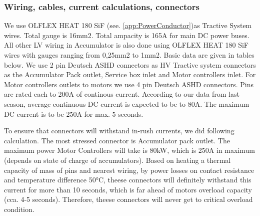 \subsubsection{Wiring, cables, current calculations, connectors}

We use OLFLEX HEAT 180 SiF (see. \ref{app:PowerConductor})as Tractive System wires. Total gauge is 16mm2. Total ampacity is 165A for main DC power buses. All other LV wiring in Accumulator is also done using OLFLEX HEAT 180 SiF wires with gauges ranging from 0,25mm2 to 1mm2. Basic data are given in tables below. We use 2 pin Deutsch ASHD connectors as HV Tractive system connectors as the Accumulator Pack outlet, Service box inlet and Motor controllers inlet. For Motor controllers outlets to motors we use 4 pin Deutsch ASHD connectors. Pins are rated each to 200A of continous current. According to our data from last season, average continuous DC current is expected to be to 80A. The maximum DC current is to be 250A for max. 5 seconds.

To ensure that connectors will withstand in-rush currents, we did following calculation. The most stressed connector is Accumulator pack outlet. The maximum power Motor Controllers will take is 80kW, which is 250A in maximum (depends on state of charge of accumulators). Based on heating a thermal capacity of mass of pins and nearest wiring, by power losses on contact resistance and temperature difference 50°C, theese connectors will definitely withstand this current for more than 10 seconds, which is far ahead of motors overload capacity (cca. 4-5 seconds). Therefore, theese connectors will never get to critical overload condition.


